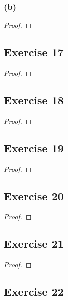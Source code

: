 \documentclass[14pt]{extarticle}
\begin{document}
\subsubsection{(b)}

\begin{proof}

\end{proof}

\subsection{Exercise 17}

\begin{proof}

\end{proof}

\subsection{Exercise 18}

\begin{proof}

\end{proof}

\subsection{Exercise 19}

\begin{proof}

\end{proof}

\subsection{Exercise 20}

\begin{proof}

\end{proof}

\subsection{Exercise 21}

\begin{proof}

\end{proof}

\subsection{Exercise 22}
\end{document}
